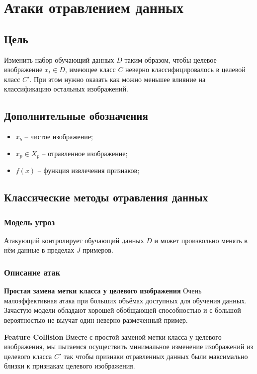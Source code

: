 \section{Атаки отравлением данных}
\subsection*{Цель}
Изменить набор обучающий данных $D$ таким образом, чтобы целевое изображение $x_t \in D$, имеющее класс $C$ неверно классифицировалось в целевой класс $C'$.
При этом нужно оказать как можно меньшее влияние на классификацию остальных изображений.

\subsection*{Дополнительные обозначения}
\begin{itemize}
    \item ${x_{b}}$ – чистое изображение;
    \item ${x_{p} \in X_p}$ – отравленное изображение;
    \item $f(x)$ – функция извлечения признаков;
\end{itemize}

\subsection*{Классические методы отравления данных}

\subsubsection*{Модель угроз}
Атакующий контролирует обучающий данных $D$ и может произвольно менять в нём данные в пределах $J$ примеров.

\subsubsection*{Описание атак}
\textbf{Простая замена метки класса у целевого изображения}
Очень малоэффективная атака при больших объёмах доступных для обучения данных. Зачастую модели обладают хорошей обобщающей способностью и с большой вероятностью не выучат один неверно размеченный пример.

\textbf{Feature Collision}
Вместе с простой заменой метки класса у целевого изображения, мы пытаемся осуществить минимальное изменение изображений из целевого класса $C'$ так чтобы признаки отравленных данных были максимально близки к признакам целевого изображения.


